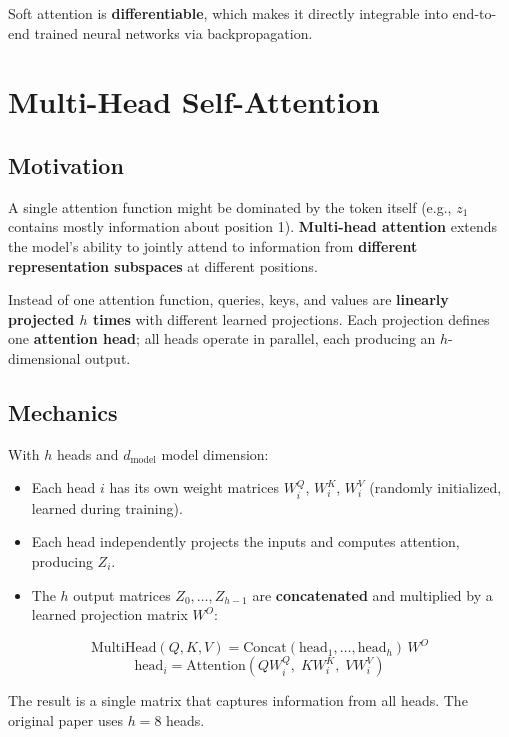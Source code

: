 \documentclass[11pt,a4paper]{article}
\theoremstyle{definition}
\theoremstyle{plain}
\theoremstyle{remark}
\begin{document}
\begin{tcolorbox}[colback=orange!5!white,colframe=orange!75!black,title=\textbf{Key Property}]
Soft attention is \textbf{differentiable}, which makes it directly integrable into end-to-end trained neural networks via backpropagation.
\end{tcolorbox}


\section{Multi-Head Self-Attention}

\subsection{Motivation}

A single attention function might be dominated by the token itself (e.g., $z_1$ contains mostly information about position 1). \textbf{Multi-head attention} extends the model's ability to jointly attend to information from \textbf{different representation subspaces} at different positions.

Instead of one attention function, queries, keys, and values are \textbf{linearly projected $h$ times} with different learned projections. Each projection defines one \textbf{attention head}; all heads operate in parallel, each producing an $h$-dimensional output.

\subsection{Mechanics}

With $h$ heads and $d_\text{model}$ model dimension:
\begin{itemize}
    \item Each head $i$ has its own weight matrices $W_i^Q$, $W_i^K$, $W_i^V$ (randomly initialized, learned during training).
    \item Each head independently projects the inputs and computes attention, producing $Z_i$.
    \item The $h$ output matrices $Z_0, \ldots, Z_{h-1}$ are \textbf{concatenated} and multiplied by a learned projection matrix $W^O$:
\end{itemize}
\[
    \mathrm{MultiHead}(Q, K, V) = \mathrm{Concat}(\mathrm{head}_1, \ldots, \mathrm{head}_h)\, W^O
\]
\[
    \mathrm{head}_i = \mathrm{Attention}(Q W_i^Q,\; K W_i^K,\; V W_i^V)
\]

The result is a single matrix that captures information from all heads. The original paper uses $h = 8$ heads.
\end{document}
